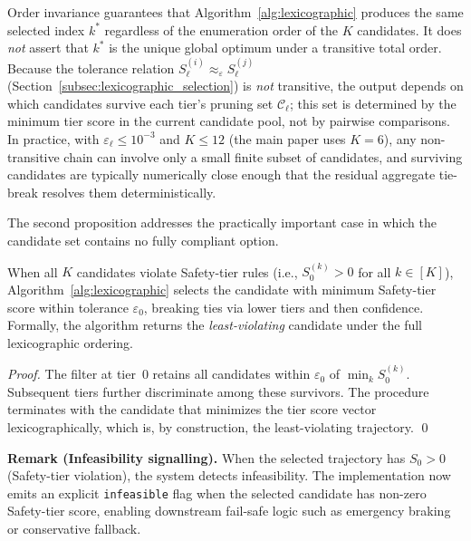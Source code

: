 \begin{remark}
\label{rem:order_invariance_scope}
Order invariance guarantees that Algorithm~\ref{alg:lexicographic} produces the same selected index $k^*$ regardless of the enumeration order of the $K$ candidates.  It does \emph{not} assert that $k^*$ is the unique global optimum under a transitive total order.  Because the tolerance relation $S_\ell^{(i)} \approx_\varepsilon S_\ell^{(j)}$ (Section~\ref{subsec:lexicographic_selection}) is \emph{not} transitive, the output depends on which candidates survive each tier's pruning set $\mathcal{C}_\ell$; this set is determined by the minimum tier score in the current candidate pool, not by pairwise comparisons.  In practice, with $\varepsilon_\ell \leq 10^{-3}$ and $K \leq 12$ (the main paper uses $K{=}6$), any non-transitive chain can involve only a small finite subset of candidates, and surviving candidates are typically numerically close enough that the residual aggregate tie-break resolves them deterministically.
\end{remark}

The second proposition addresses the practically important case in which the candidate set contains no fully compliant option.

\begin{proposition}
\label{thm:infeasibility}
When all $K$ candidates violate Safety-tier rules (i.e., $S_0^{(k)} > 0$ for all $k \in [K]$), Algorithm~\ref{alg:lexicographic} selects the candidate with minimum Safety-tier score within tolerance $\varepsilon_0$, breaking ties via lower tiers and then confidence. Formally, the algorithm returns the \emph{least-violating} candidate under the full lexicographic ordering.
\end{proposition}
\begin{proof}
The filter at tier~0 retains all candidates within $\varepsilon_0$ of $\min_k S_0^{(k)}$. Subsequent tiers further discriminate among these survivors. The procedure terminates with the candidate that minimizes the tier score vector lexicographically, which is, by construction, the least-violating trajectory. \qed
\end{proof}

\noindent\textbf{Remark (Infeasibility signalling).} When the selected trajectory has $S_0 > 0$ (Safety-tier violation), the system detects infeasibility.  The implementation now emits an explicit \texttt{infeasible} flag when the selected candidate has non-zero Safety-tier score, enabling downstream fail-safe logic such as emergency braking or conservative fallback.

